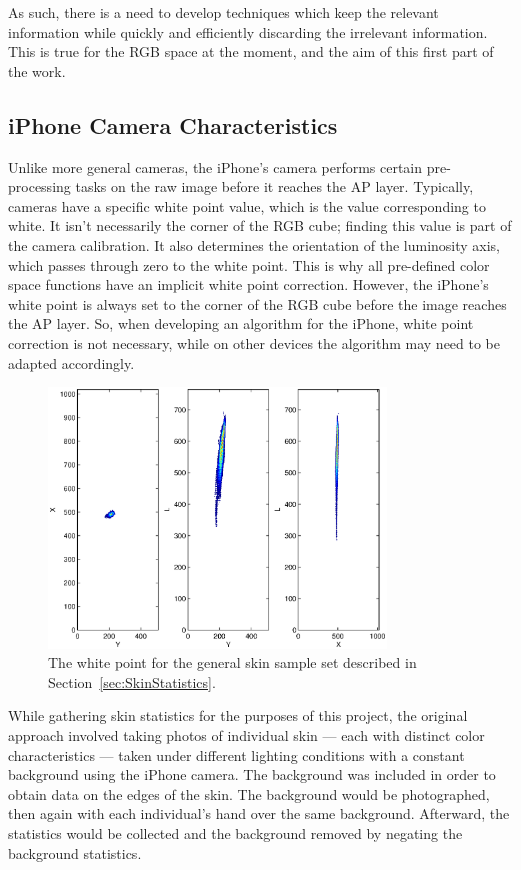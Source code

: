 As such, there is a need to develop techniques which keep the relevant information while quickly and efficiently discarding the irrelevant information. This is true for the RGB space at the moment, and the aim of this first part of the work.

\subsection{iPhone Camera Characteristics} \label{sec:iPhoneCameraCharacteristics}

Unlike more general cameras, the iPhone's camera performs certain pre-processing tasks on the raw image before it reaches the AP layer. Typically, cameras have a specific white point value, which is the value corresponding to white. It isn't necessarily the corner of the RGB cube; finding this value is part of the camera calibration. It also determines the orientation of the luminosity axis, which passes through zero to the white point. This is why all pre-defined color space functions have an implicit white point correction. However, the iPhone's white point is always set to the corner of the RGB cube before the image reaches the AP layer. So, when developing an algorithm for the iPhone, white point correction is not necessary, while on other devices the algorithm may need to be adapted accordingly.

\begin{figure}[h!]
  \centering
    \includegraphics[width=0.80\textwidth]{Chapter2/Figs/lxy_general_white_point.eps}
    \caption{The white point for the general skin sample set described in Section~\ref{sec:SkinStatistics}.}  \label{fig:WhitePoint}
\end{figure}

While gathering skin statistics for the purposes of this project, the original approach involved taking photos of individual skin --- each with distinct color characteristics --- taken under different lighting conditions with a constant background using the iPhone camera. The background was included in order to obtain data on the edges of the skin. The background would be photographed, then again with each individual's hand over the same background. Afterward, the statistics would be collected and the background removed by negating the background statistics.

